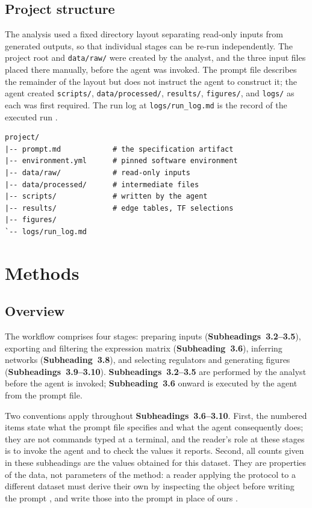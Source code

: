 \subsection{Project structure}

The analysis used a fixed directory layout separating read-only inputs from generated outputs, so that individual stages can be re-run independently. The project root and \texttt{data/raw/} were created by the analyst, and the three input files placed there manually, before the agent was invoked. The prompt file describes the remainder of the layout but does not instruct the agent to construct it; the agent created \texttt{scripts/}, \texttt{data/processed/}, \texttt{results/}, \texttt{figures/}, and \texttt{logs/} as each was first required. The run log at \texttt{logs/run\_log.md} is the record of the executed run .

\begin{lstlisting}
project/
|-- prompt.md            # the specification artifact
|-- environment.yml      # pinned software environment
|-- data/raw/            # read-only inputs
|-- data/processed/      # intermediate files
|-- scripts/             # written by the agent
|-- results/             # edge tables, TF selections
|-- figures/
`-- logs/run_log.md
\end{lstlisting}

\section{Methods}

\subsection{Overview}

The workflow comprises four stages: preparing inputs (\textbf{Subheadings~3.2--3.5}), exporting and filtering the expression matrix (\textbf{Subheading~3.6}), inferring networks (\textbf{Subheading~3.8}), and selecting regulators and generating figures (\textbf{Subheadings~3.9--3.10}). \textbf{Subheadings~3.2--3.5} are performed by the analyst before the agent is invoked; \textbf{Subheading~3.6} onward is executed by the agent from the prompt file.

Two conventions apply throughout \textbf{Subheadings~3.6--3.10}. First, the numbered items state what the prompt file specifies and what the agent consequently does; they are not commands typed at a terminal, and the reader's role at these stages is to invoke the agent and to check the values it reports. Second, all counts given in these subheadings are the values obtained for this dataset. They are properties of the data, not parameters of the method: a reader applying the protocol to a different dataset must derive their own by inspecting the object before writing the prompt , and write those into the prompt in place of ours .

